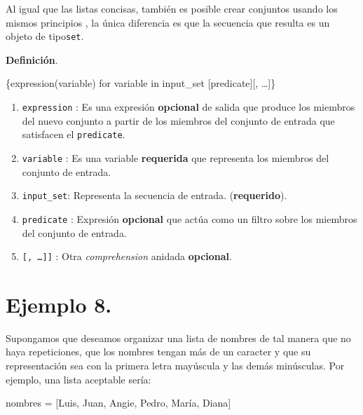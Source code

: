 \documentclass[
  letterpaper,
  DIV=11,
  numbers=noendperiod]{scrreprt}
\newenvironment{Shaded}{\begin{snugshade}}{\end{snugshade}}
\newcommand{\ControlFlowTok}[1]{\textcolor[rgb]{0.00,0.23,0.31}{#1}}
\newcommand{\KeywordTok}[1]{\textcolor[rgb]{0.00,0.23,0.31}{#1}}
\newcommand{\NormalTok}[1]{\textcolor[rgb]{0.00,0.23,0.31}{#1}}
\newcommand{\OperatorTok}[1]{\textcolor[rgb]{0.37,0.37,0.37}{#1}}
\newcommand{\StringTok}[1]{\textcolor[rgb]{0.13,0.47,0.30}{#1}}
\begin{document}
Al igual que las listas concisas, también es posible crear conjuntos
usando los mismos principios , la única diferencia es que la secuencia
que resulta es un objeto de tipo\texttt{set}.

\textbf{Definición}.

\begin{Shaded}
\begin{Highlighting}[]
\NormalTok{\{expression(variable) }\ControlFlowTok{for}\NormalTok{ variable }\KeywordTok{in}\NormalTok{ input\_set [predicate][, …]\}}
\end{Highlighting}
\end{Shaded}

\begin{enumerate}
\def\labelenumi{\arabic{enumi}.}
\item
  \texttt{expression} : Es una expresión \textbf{opcional} de salida que
  produce los miembros del nuevo conjunto a partir de los miembros del
  conjunto de entrada que satisfacen el \texttt{predicate}.
\item
  \texttt{variable} : Es una variable \textbf{requerida} que representa
  los miembros del conjunto de entrada.
\item
  \texttt{input\_set}: Representa la secuencia de entrada.
  (\textbf{requerido}).
\item
  \texttt{predicate} : Expresión \textbf{opcional} que actúa como un
  filtro sobre los miembros del conjunto de entrada.
\item
  \texttt{{[},\ …{]}{]}} : Otra \emph{comprehension} anidada
  \textbf{opcional}.
\end{enumerate}

\section{\texorpdfstring{\textbf{Ejemplo
8.}}{Ejemplo 8.}}\label{ejemplo-8.-1}

Supongamos que deseamos organizar una lista de nombres de tal manera que
no haya repeticiones, que los nombres tengan más de un caracter y que su
representación sea con la primera letra mayúscula y las demás
minúsculas. Por ejemplo, una lista aceptable sería:

\begin{Shaded}
\begin{Highlighting}[]
\NormalTok{nombres }\OperatorTok{=}\NormalTok{ [}\StringTok{\textquotesingle{}Luis\textquotesingle{}}\NormalTok{, }\StringTok{\textquotesingle{}Juan\textquotesingle{}}\NormalTok{, }\StringTok{\textquotesingle{}Angie\textquotesingle{}}\NormalTok{, }\StringTok{\textquotesingle{}Pedro\textquotesingle{}}\NormalTok{, }\StringTok{\textquotesingle{}María\textquotesingle{}}\NormalTok{, }\StringTok{\textquotesingle{}Diana\textquotesingle{}}\NormalTok{]}
\end{Highlighting}
\end{Shaded}
\end{document}
